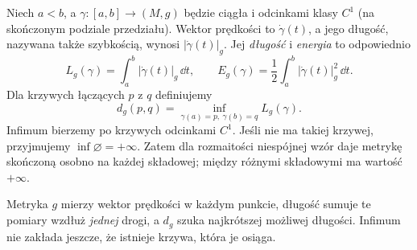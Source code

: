 \begin{definicja}
\label{def:dlugosc-energia}
Niech $a<b$, a $\gamma:[a,b]\to(M,g)$ będzie ciągła
i odcinkami klasy $C^1$ (na skończonym podziale przedziału).
Wektor prędkości to $\dot\gamma(t)$, a jego długość,
nazywana także szybkością, wynosi $|\dot\gamma(t)|_g$.
Jej \emph{długość} i
\emph{energia} to odpowiednio
\begin{equation}\label{eq:dlugosc-energia}
 L_g(\gamma)=\int_a^b|\dot\gamma(t)|_g\,\dd t,
 \qquad
 E_g(\gamma)=\frac12\int_a^b
                  |\dot\gamma(t)|_g^2\,\dd t.
\end{equation}
Dla krzywych łączących $p$ z $q$ definiujemy
\begin{equation}\label{eq:odleglosc-riemannowska}
 d_g(p,q)=\inf_{\gamma(a)=p,\ \gamma(b)=q}
                 L_g(\gamma).
\end{equation}
Infimum bierzemy po krzywych odcinkami $C^1$.
Jeśli nie ma takiej krzywej, przyjmujemy $\inf\varnothing=+\infty$.
Zatem dla rozmaitości niespójnej wzór daje metrykę
skończoną osobno na każdej składowej; między różnymi
składowymi ma wartość $+\infty$.
\end{definicja}

Metryka $g$ mierzy wektor prędkości w każdym
punkcie, długość sumuje te pomiary wzdłuż
\emph{jednej} drogi, a $d_g$ szuka najkrótszej
możliwej długości. Infimum nie zakłada jeszcze,
że istnieje krzywa, która je osiąga.

